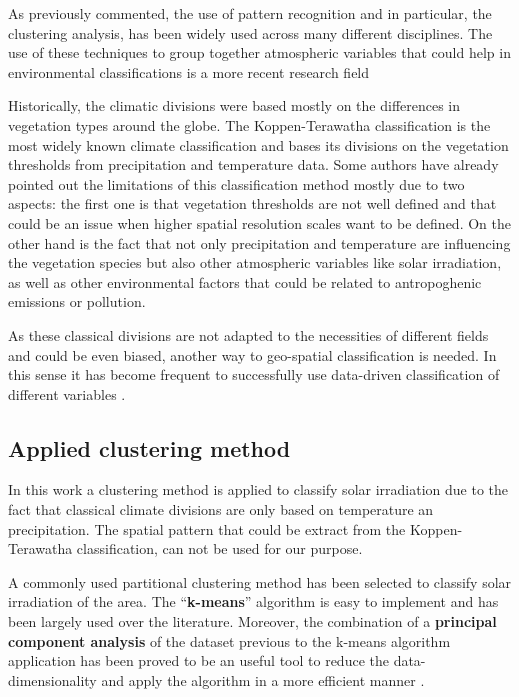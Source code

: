 As previously commented, the use of pattern recognition and in particular, the clustering analysis, has been widely used across many different disciplines. The use of these techniques to group together atmospheric variables that could help in environmental classifications is a more recent research field \cite*{ZSCHEISCHLER2012897}

Historically, the climatic divisions were based mostly on the differences in vegetation types around the globe. The Koppen-Terawatha classification \cite*{Kottek2006} is the most widely known climate classification and bases its divisions on the vegetation thresholds from precipitation and temperature data. Some authors have already pointed out the limitations of this classification method mostly due to two aspects: the first one is that vegetation thresholds are not well defined and that could be an issue when higher spatial resolution scales want to be defined. On the other hand is the fact that not only precipitation and temperature are influencing the vegetation species but also other atmospheric variables like solar irradiation, as well as other environmental factors that could be related to antropoghenic emissions or pollution.


As these classical divisions are not adapted to the necessities of different fields and could be even biased, another way to geo-spatial classification is needed. In this sense it has become frequent to successfully use data-driven classification of different variables \cite{Argueso2011, Zagouras2013, Zagouras2014, Zagouras2014b, ZSCHEISCHLER2012897}. 

\subsection{Applied clustering method}

In this work a clustering method is applied to classify solar irradiation due to the fact that classical climate divisions are only based on temperature an precipitation. The spatial pattern that could be extract from the Koppen-Terawatha classification, can not be used for our purpose.

A commonly used partitional clustering method has been selected to classify solar irradiation of the area. The ``\textbf{k-means}'' algorithm is easy to implement and has been largely used over the literature. Moreover, the combination of a \textbf{principal component analysis} of the dataset previous to the k-means algorithm application has been proved to be an useful tool to reduce the data-dimensionality and apply the algorithm in a more efficient manner \cite*{Ding2004}.

